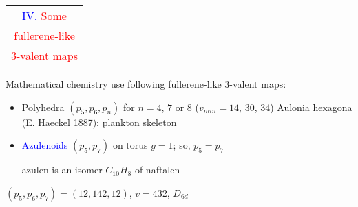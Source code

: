 \documentclass[%
pdf,
colorBG,
slideColor,
]{prosper}
\begin{document}
\begin{slide}{}
\begin{center}
{\Huge 
\begin{tabular*}{6cm}{c}
\\[-0.5cm]
\textcolor{blue}{IV. }\textcolor{red}{Some}\\
\textcolor{red}{fullerene-like}\\
\textcolor{red}{3-valent maps}
\end{tabular*}
}
\end{center}
\end{slide}





\begin{slide}{Mathematical chemistry}
use following fullerene-like $3$-valent maps:
\begin{itemize}
\item Polyhedra $(p_5, p_6, p_n)$ for $n=4$, $7$ or $8$ ($v_{min}=14$, $30$, $34$) Aulonia hexagona (E. Haeckel 1887): plankton skeleton
\item \textcolor{blue}{Azulenoids} $(p_5, p_7)$ on torus $g=1$; so, $p_5=p_7$\par
azulen  is an isomer $C_{10}H_{8}$ of naftalen 
\end{itemize}


\begin{center}
\begin{minipage}[b]{5.5cm}
\centering
{}\par
\end{minipage}
\hspace{0.1cm}
\begin{minipage}[b]{5.5cm}
\centering
{}\par
$(p_5, p_6, p_7)=(12, 142, 12)$, $v=432$, $D_{6d}$
\end{minipage}
\end{center}



\end{slide}
\end{document}
